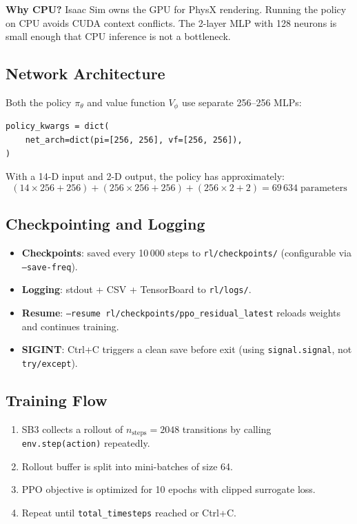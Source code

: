 \documentclass[11pt, a4paper]{article}
\begin{document}
\textbf{Why CPU?}\; Isaac Sim owns the GPU for PhysX rendering.
Running the policy on CPU avoids CUDA context conflicts.  The 2-layer MLP
with 128 neurons is small enough that CPU inference is not a bottleneck.

\subsection{Network Architecture}

Both the policy $\pi_\theta$ and value function $V_\phi$ use separate
256--256 MLPs:

\begin{lstlisting}
policy_kwargs = dict(
    net_arch=dict(pi=[256, 256], vf=[256, 256]),
)
\end{lstlisting}

With a 14-D input and 2-D output, the policy has approximately:
\[
  (14 \times 256 + 256) + (256 \times 256 + 256) + (256 \times 2 + 2)
  = 69\,634 \;\text{parameters}
\]

\subsection{Checkpointing and Logging}

\begin{itemize}[nosep]
  \item \textbf{Checkpoints}: saved every 10\,000 steps to \texttt{rl/checkpoints/}
        (configurable via \texttt{--save-freq}).
  \item \textbf{Logging}: stdout + CSV + TensorBoard to \texttt{rl/logs/}.
  \item \textbf{Resume}: \texttt{--resume rl/checkpoints/ppo\_residual\_latest}
        reloads weights and continues training.
  \item \textbf{SIGINT}: Ctrl+C triggers a clean save before exit
        (using \texttt{signal.signal}, not \texttt{try/except}).
\end{itemize}

\subsection{Training Flow}

\begin{enumerate}[nosep]
  \item SB3 collects a rollout of $n_{\text{steps}} = 2048$ transitions by
        calling \texttt{env.step(action)} repeatedly.
  \item Rollout buffer is split into mini-batches of size 64.
  \item PPO objective is optimized for 10 epochs with clipped surrogate loss.
  \item Repeat until \texttt{total\_timesteps} reached or Ctrl+C.
\end{enumerate}
\end{document}
